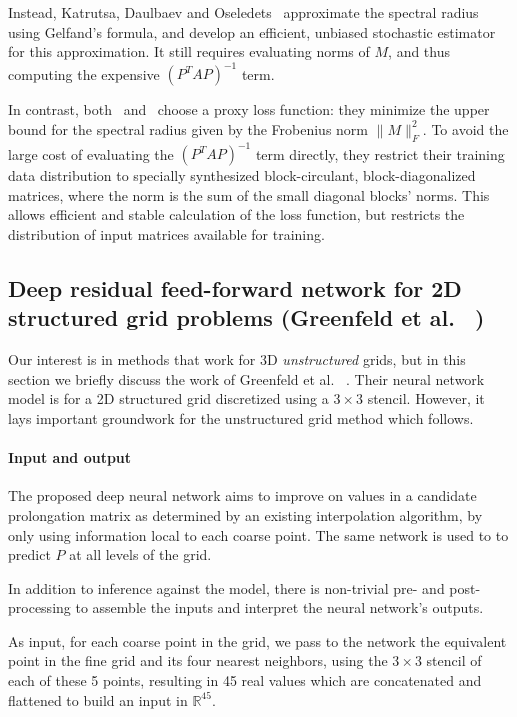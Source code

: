 \documentclass{svproc}
\newcommand{\etal}{et al. }
\begin{document}
Instead, Katrutsa, Daulbaev and Oseledets~\cite{Katrutsa2017} approximate the spectral radius using Gelfand's formula, and develop an efficient, unbiased stochastic estimator for this approximation. It still requires evaluating norms of $M$, and thus computing the expensive $(P^TAP)^{-1}$ term.

In contrast, both~\cite{Luz2020} and~\cite{Greenfeld2019} choose a proxy loss function: they minimize the upper bound for the spectral radius given by the Frobenius norm $\|M\|^2_{F}$. To avoid the large cost of evaluating the $(P^TAP)^{-1}$ term directly, they restrict their training data distribution to specially synthesized block-circulant, block-diagonalized matrices, where the norm is the sum of the small diagonal blocks' norms. This allows efficient and stable calculation of the loss function, but restricts the distribution of input matrices available for training.

\subsection{Deep residual feed-forward network for 2D structured grid problems (Greenfeld \etal~\cite{Greenfeld2019})}
\label{sec:greenfeld}
Our interest is in methods that work for 3D \textit{unstructured} grids, but in this section we briefly discuss the work of Greenfeld \etal~\cite{Greenfeld2019}. Their neural network model is for a 2D structured grid discretized using a $3\times 3$ stencil. However, it lays important groundwork for the unstructured grid method which follows.

\paragraph{Input and output}
The proposed deep neural network aims to improve on values in a candidate prolongation matrix as determined by an existing interpolation algorithm, by only using information local to each coarse point. The same network is used to to predict $P$ at all levels of the grid.

In addition to inference against the model, there is non-trivial pre- and post-processing to assemble the inputs and interpret the neural network's outputs.

As input, for each coarse point in the grid, we pass to the network the equivalent point in the fine grid and its four nearest neighbors, using the $3 \times 3$ stencil of each of these 5 points, resulting in 45 real values which are concatenated and flattened to build an input in $\mathbb{R}^{45}$. 
\end{document}
